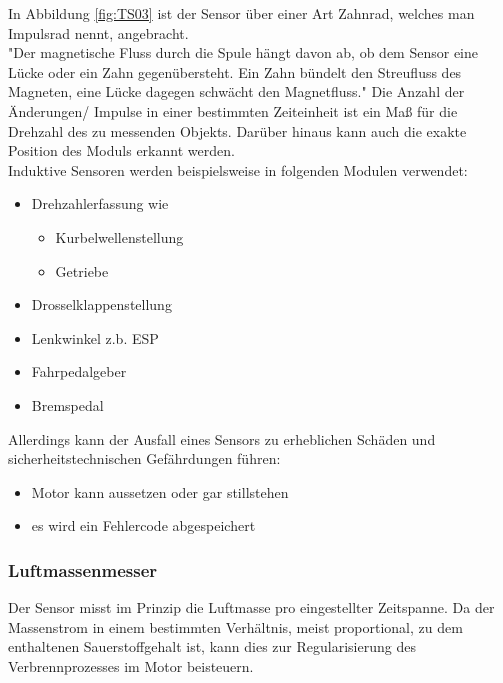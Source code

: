 \begin{flushleft}
				In Abbildung \ref{fig:TS03} ist der Sensor über einer Art Zahnrad, welches man Impulsrad nennt, angebracht.\\
	            
	            "Der magnetische Fluss durch die Spule hängt davon ab, ob dem Sensor eine Lücke oder ein Zahn gegenübersteht. Ein Zahn bündelt den Streufluss des Magneten, eine Lücke dagegen schwächt den Magnetfluss." \cite{TS_ind_funkt}  
				Die Anzahl der Änderungen/ Impulse in einer bestimmten Zeiteinheit ist ein Maß für die Drehzahl des zu messenden Objekts. Darüber hinaus kann auch die exakte Position des Moduls erkannt werden.\\					
	            
				Induktive Sensoren werden beispielsweise in folgenden Modulen verwendet:
				
				\begin{itemize}
					\item Drehzahlerfassung wie
						\begin{itemize}
							\item Kurbelwellenstellung
							\item Getriebe
						\end{itemize}	
					\item Drosselklappenstellung
					\item Lenkwinkel z.b. ESP
					\item Fahrpedalgeber
					\item Bremspedal
				\end{itemize}
			
				Allerdings kann der Ausfall eines Sensors zu erheblichen Schäden und sicherheitstechnischen Gefährdungen führen:
				\begin{itemize}
					\item Motor kann aussetzen oder gar stillstehen
					\item es wird ein Fehlercode abgespeichert
	            \end{itemize}
	           
	          
	           \subsubsection{Luftmassenmesser}
	           
	            Der Sensor misst im Prinzip die Luftmasse pro eingestellter Zeitspanne. Da der Massenstrom in einem bestimmten Verhältnis, meist proportional, zu dem enthaltenen Sauerstoffgehalt ist, kann dies zur Regularisierung des Verbrennprozesses im Motor beisteuern.
	           

\end{flushleft}
